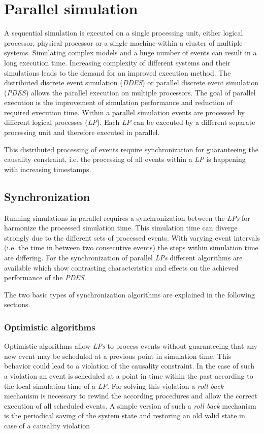 \chapter{Parallel simulation}
\label{cha:parallel_sim}
A sequential simulation is executed on a single processing unit, either logical processor, physical processor or a single machine within a cluster of multiple systems.
Simulating complex models and a huge number of events can result in a long execution time.
Increasing complexity of different systems and their simulations leads to the demand for an improved execution method.
The distributed discrete event simulation (\emph{DDES}) or parallel discrete event simulation (\emph{PDES}) allows the parallel execution on multiple processors.
The goal of parallel execution is the improvement of simulation performance and reduction of required execution time.
Within a parallel simulation events are processed by different logical processes (\emph{LP}).
Each \emph{LP} can be executed by a different separate processing unit and therefore executed in parallel. \cite{bagrodia_parsec:_1998}

This distributed processing of events require synchronization for guaranteeing the causality constraint, i.e. the processing of all events within a \emph{LP} is happening with increasing timestamps.

\section{Synchronization}
\label{sec:parallel_synchronization}
Running simulations in parallel requires a synchronization between the \emph{LPs} for harmonize the processed simulation time.
This simulation time can diverge strongly due to the different sets of processed events.
With varying event intervals (i.e. the time in between two consecutive events) the steps within simulation time are differing.
For the synchronization of parallel \emph{LPs} different algorithms are available which show contrasting characteristics and effects on the achieved performance of the \emph{PDES}. \cite[chapter 2]{bagrodia_performance_2000}

The two basic types of synchronization algorithms are explained in the following sections.

\subsection{Optimistic algorithms}
\label{sec:parallel_synchronization_optimistic}
Optimistic algorithms allow \emph{LPs} to process events without guaranteeing that any new event may be scheduled at a previous point in simulation time.
This behavior could lead to a violation of the causality constraint.
In the case of such a violation an event is scheduled at a point in time within the past according to the local simulation time of a \emph{LP}.
For solving this violation a \emph{roll back} mechanism is necessary to rewind the according procedures and allow the correct execution of all scheduled events.
A simple version of such a \emph{roll back} mechanism is the periodical saving of the system state and restoring an old valid state in case of a causality violation \cite{bagrodia_parsec:_1998}
    
